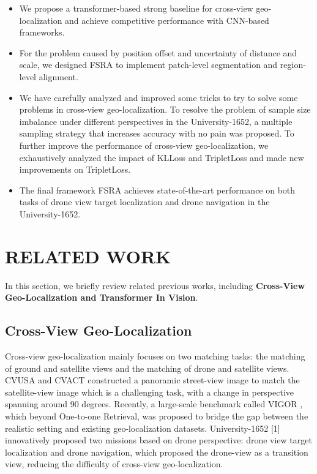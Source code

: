 \documentclass[lettersize,journal]{IEEEtran}
\begin{document}
\begin{itemize}
\item{We propose a transformer-based strong baseline for cross-view geo-localization and achieve competitive performance with CNN-based frameworks.}
\item{For the problem caused by position offset and uncertainty of distance and scale, we designed FSRA to implement patch-level segmentation and region-level alignment.}
\item{We have carefully analyzed and improved some tricks to try to solve some problems in cross-view geo-localization. To resolve the problem of sample size imbalance under different perspectives in the University-1652, a multiple sampling strategy that increases accuracy with no pain was proposed. To further improve the performance of cross-view geo-localization, we exhaustively analyzed the impact of KLLoss \cite{ref25} and TripletLoss and made new improvements on TripletLoss.}
\item{The final framework FSRA achieves state-of-the-art performance on both tasks of drone view target localization and drone navigation in the University-1652.}
\end{itemize}


\section{RELATED WORK}
In this section, we briefly review related previous works, including \textbf{Cross-View Geo-Localization and Transformer In Vision}.

\subsection{Cross-View Geo-Localization}
Cross-view geo-localization mainly focuses on two matching tasks: the matching of ground and satellite views and the matching of drone and satellite views. CVUSA \cite{ref26} and CVACT \cite{ref27} constructed a panoramic street-view image to match the satellite-view image which is a challenging task, with a change in perspective spanning around 90 degrees. Recently, a large-scale benchmark called VIGOR \cite{ref52}, which beyond One-to-one Retrieval, was proposed to bridge the gap between the realistic setting and existing geo-localization datasets. University-1652 [1] innovatively proposed two missions based on drone perspective: drone view target localization and drone navigation, which proposed the drone-view as a transition view, reducing the difficulty of cross-view geo-localization. 
\end{document}
